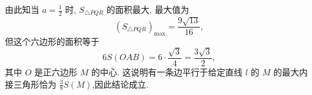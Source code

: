 由此知当 $a=\frac{1}{2}$ 时, $S_{\triangle P Q R}$ 的面积最大, 最大值为
$$
\left(S_{\triangle P Q R}\right)_{\max }=\frac{9 \sqrt{13}}{16},
$$
但这个六边形的面积等于
$$
6 S(O A B)=6 \cdot \frac{\sqrt{3}}{4}=\frac{3 \sqrt{3}}{2},
$$
其中 $O$ 是正六边形 $M$ 的中心.
这说明有一条边平行于给定直线 $l$ 的 $M$ 的最大内接三角形恰为 $\frac{3}{8} S(M)$,因此结论成立.


